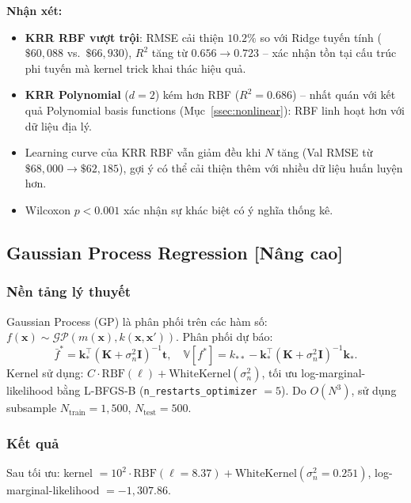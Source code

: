 \documentclass[12pt,a4paper]{article}
\begin{document}
\textbf{Nhận xét:}
\begin{itemize}
  \item \textbf{KRR RBF vượt trội}: RMSE cải thiện $\mathbf{10.2\%}$ so với
        Ridge tuyến tính ($\$60{,}088$ vs.\ $\$66{,}930$), $R^2$ tăng từ
        $0.656 \to 0.723$ -- xác nhận tồn tại cấu trúc phi tuyến mà
        kernel trick khai thác hiệu quả.
  \item \textbf{KRR Polynomial} ($d=2$) kém hơn RBF ($R^2 = 0.686$) --
        nhất quán với kết quả Polynomial basis functions (Mục~\ref{ssec:nonlinear}):
        RBF linh hoạt hơn với dữ liệu địa lý.
  \item Learning curve của KRR RBF vẫn giảm đều khi $N$ tăng (Val RMSE
        từ $\$68{,}000 \to \$62{,}185$), gợi ý có thể cải thiện thêm với
        nhiều dữ liệu huấn luyện hơn.
  \item Wilcoxon $p < 0.001$ xác nhận sự khác biệt có ý nghĩa thống kê.
\end{itemize}

\subsection{Gaussian Process Regression [Nâng cao]}
\label{ssec:gpr}

\subsubsection{Nền tảng lý thuyết}

Gaussian Process (GP) là phân phối trên các hàm số:
$f(\mathbf{x}) \sim \mathcal{GP}(m(\mathbf{x}), k(\mathbf{x}, \mathbf{x}'))$.
Phân phối dự báo:
\begin{equation}
  \bar{f}^* = \mathbf{k}_*^\top(\mathbf{K} + \sigma_n^2\mathbf{I})^{-1}\mathbf{t},
  \quad
  \mathbb{V}[f^*] = k_{**} - \mathbf{k}_*^\top(\mathbf{K}+\sigma_n^2\mathbf{I})^{-1}\mathbf{k}_*.
  \label{eq:gpr}
\end{equation}
Kernel sử dụng: $C \cdot \text{RBF}(\ell) + \text{WhiteKernel}(\sigma_n^2)$,
tối ưu log-marginal-likelihood bằng L-BFGS-B
(\texttt{n\_restarts\_optimizer} $= 5$). Do $O(N^3)$, sử dụng
subsample $N_{\text{train}} = 1{,}500$, $N_{\text{test}} = 500$.

\subsubsection{Kết quả}

Sau tối ưu: kernel $= 10^2 \cdot \text{RBF}(\ell = 8.37) +
\text{WhiteKernel}(\sigma_n^2 = 0.251)$,
log-marginal-likelihood $= -1{,}307.86$.
\end{document}
